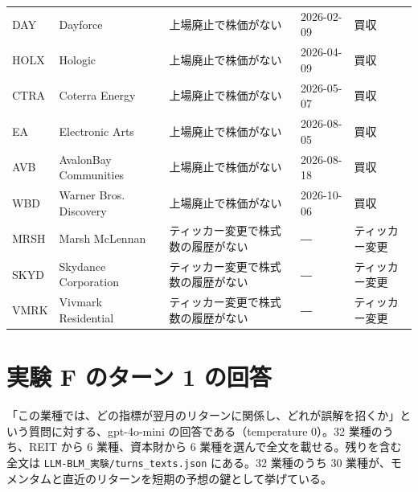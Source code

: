 \documentclass[xelatex,ja=standard,jafont=hiragino-pron,a4paper,10pt]{bxjsreport}
\newcommand{\code}[1]{\texttt{#1}}
\begin{document}
{\begin{longtable}{lp{3.60cm}p{4.00cm}lp{3.00cm}}
DAY & Dayforce & 上場廃止で株価がない & 2026-02-09 & 買収 \\
HOLX & Hologic & 上場廃止で株価がない & 2026-04-09 & 買収 \\
CTRA & Coterra Energy & 上場廃止で株価がない & 2026-05-07 & 買収 \\
EA & Electronic Arts & 上場廃止で株価がない & 2026-08-05 & 買収 \\
AVB & AvalonBay Communities & 上場廃止で株価がない & 2026-08-18 & 買収 \\
WBD & Warner Bros. Discovery & 上場廃止で株価がない & 2026-10-06 & 買収 \\
MRSH & Marsh McLennan & ティッカー変更で株式数の履歴がない & ― & ティッカー変更 \\
SKYD & Skydance Corporation & ティッカー変更で株式数の履歴がない & ― & ティッカー変更 \\
VMRK & Vivmark Residential & ティッカー変更で株式数の履歴がない & ― & ティッカー変更 \\
\end{longtable}
}

\chapter{実験 F のターン 1 の回答}\label{app:turn1}

「この業種では、どの指標が翌月のリターンに関係し、どれが誤解を招くか」という質問に対する、gpt-4o-mini の回答である（temperature 0）。32 業種のうち、REIT から 6 業種、資本財から 6 業種を選んで全文を載せる。残りを含む全文は \code{LLM-BLM\_実験/turns\_texts.json} にある。32 業種のうち 30 業種が、モメンタムと直近のリターンを短期の予想の鍵として挙げている。
\end{document}
